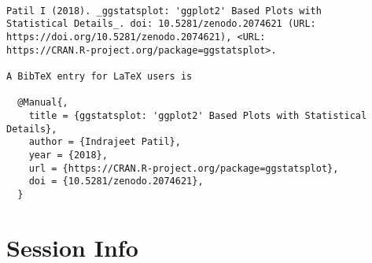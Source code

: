 \documentclass[]{article}
\begin{document}
\begin{verbatim}

Patil I (2018). _ggstatsplot: 'ggplot2' Based Plots with
Statistical Details_. doi: 10.5281/zenodo.2074621 (URL:
https://doi.org/10.5281/zenodo.2074621), <URL:
https://CRAN.R-project.org/package=ggstatsplot>.

A BibTeX entry for LaTeX users is

  @Manual{,
    title = {ggstatsplot: 'ggplot2' Based Plots with Statistical Details},
    author = {Indrajeet Patil},
    year = {2018},
    url = {https://CRAN.R-project.org/package=ggstatsplot},
    doi = {10.5281/zenodo.2074621},
  }
\end{verbatim}

\pagebreak

\hypertarget{session-info}{%
\section{Session Info}\label{session-info}}
\end{document}
